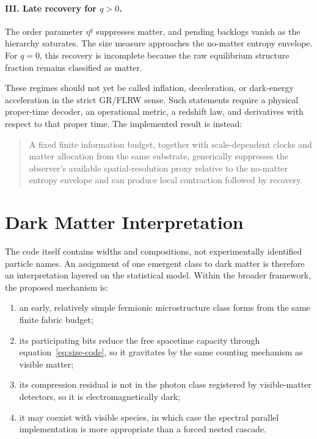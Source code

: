 \documentclass[11pt]{article}
\begin{document}
\paragraph{III. Late recovery for $q>0$.}
The order parameter $\eta^q$ suppresses matter, and pending backlogs vanish as
the hierarchy saturates.  The size measure approaches the no-matter entropy
envelope.  For $q=0$, this recovery is incomplete because the raw equilibrium
structure fraction remains classified as matter.

These regimes should not yet be called inflation, deceleration, or dark-energy
acceleration in the strict GR/FLRW sense.  Such statements require a physical
proper-time decoder, an operational metric, a redshift law, and derivatives
with respect to that proper time.  The implemented result is instead:
\begin{quote}
A fixed finite information budget, together with scale-dependent clocks and
matter allocation from the same substrate, generically suppresses the
observer's available spatial-resolution proxy relative to the no-matter
entropy envelope and can produce local contraction followed by recovery.
\end{quote}

\section{Dark Matter Interpretation}
\label{sec:darkmatter}

The code itself contains widths and compositions, not experimentally
identified particle names.  An assignment of one emergent class to dark
matter is therefore an interpretation layered on the statistical model.
Within the broader framework, the proposed mechanism is:
\begin{enumerate}
  \item an early, relatively simple fermionic microstructure class forms from
        the same finite fabric budget;
  \item its participating bits reduce the free spacetime capacity through
        equation~\eqref{eq:size-code}, so it gravitates by the same counting
        mechanism as visible matter;
  \item its compression residual is not in the photon class registered by
        visible-matter detectors, so it is electromagnetically dark;
  \item it may coexist with visible species, in which case the spectral
        parallel implementation is more appropriate than a forced nested
        cascade.
\end{enumerate}
\end{document}
